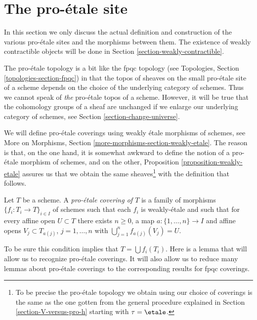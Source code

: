 \section{The pro-\'etale site}
\label{section-proetale}

\noindent
In this section we only discuss the actual definition and construction
of the various pro-\'etale sites and the morphisms between them. The
existence of weakly contractible objects will be done in
Section \ref{section-weakly-contractible}.

\medskip\noindent
The pro-\'etale topology is a bit like
the fpqc topology (see Topologies, Section \ref{topologies-section-fpqc})
in that the topos of sheaves on the small pro-\'etale site of a scheme
depends on the choice of the underlying category of schemes. Thus we cannot
speak of {\it the} pro-\'etale topos of a scheme. However, it will be
true that the cohomology groups of a sheaf are unchanged if we enlarge
our underlying category of schemes, see Section \ref{section-change-universe}.

\medskip\noindent
We will define pro-\'etale coverings using weakly \'etale morphisms of schemes,
see More on Morphisms, Section \ref{more-morphisms-section-weakly-etale}.
The reason is that, on the one hand, it is somewhat awkward to define
the notion of a pro-\'etale morphism of schemes, and on the other,
Proposition \ref{proposition-weakly-etale}
assures us that we obtain the same sheaves\footnote{To be precise
the pro-\'etale topology we obtain using our choice of coverings
is the same as the one gotten from the general procedure explained
in Section \ref{section-V-versus-pro-h} starting with $\tau = \etale$.}
with the definition that follows.

\begin{definition}
\label{definition-fpqc-covering}
Let $T$ be a scheme. A {\it pro-\'etale covering of $T$} is a family
of morphisms $\{f_i : T_i \to T\}_{i \in I}$ of schemes
such that each $f_i$ is weakly-\'etale and such that for every affine open
$U \subset T$ there exists $n \geq 0$, a map
$a : \{1, \ldots, n\} \to I$ and affine opens
$V_j \subset T_{a(j)}$, $j = 1, \ldots, n$
with $\bigcup_{j = 1}^n f_{a(j)}(V_j) = U$.
\end{definition}

\noindent
To be sure this condition implies that $T = \bigcup f_i(T_i)$.
Here is a lemma that will allow us to recognize pro-\'etale coverings.
It will also allow us to reduce many lemmas about pro-\'etale coverings
to the corresponding results for fpqc coverings.


